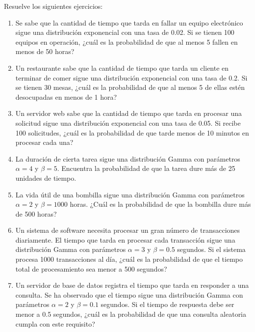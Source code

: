 \begin{Ejer}
Resuelve los siguientes ejercicios:
\begin{enumerate}

    \item Se sabe que la cantidad de tiempo que tarda en fallar un equipo electrónico sigue una distribución exponencial con una tasa de 0.02. Si se tienen 100 equipos en operación, ¿cuál es la probabilidad de que al menos 5 fallen en menos de 50 horas?

    \item Un restaurante sabe que la cantidad de tiempo que tarda un cliente en terminar de comer sigue una distribución exponencial con una tasa de 0.2. Si se tienen 30 mesas, ¿cuál es la probabilidad de que al menos 5 de ellas estén desocupadas en menos de 1 hora?

    \item Un servidor web sabe que la cantidad de tiempo que tarda en procesar una solicitud sigue una distribución exponencial con una tasa de 0.05. Si recibe 100 solicitudes, ¿cuál es la probabilidad de que tarde menos de 10 minutos en procesar cada una?

\item La duración de cierta tarea sigue una distribución Gamma con parámetros $\alpha = 4$ y $\beta = 5$. Encuentra la probabilidad de que la tarea dure más de 25 unidades de tiempo.

\item La vida útil de una bombilla sigue una distribución Gamma con parámetros $\alpha = 2$ y $\beta = 1000$ horas. ¿Cuál es la probabilidad de que la bombilla dure más de 500 horas?

\item Un sistema de software necesita procesar un gran número de transacciones diariamente. El tiempo que tarda en procesar cada transacción sigue una distribución Gamma con parámetros $\alpha = 3$ y $\beta = 0.5$ segundos. Si el sistema procesa 1000 transacciones al día, ¿cuál es la probabilidad de que el tiempo total de procesamiento sea menor a 500 segundos?

\item Un servidor de base de datos registra el tiempo que tarda en responder a una consulta. Se ha observado que el tiempo sigue una distribución Gamma con parámetros $\alpha = 2$ y $\beta = 0.1$ segundos. Si el tiempo de respuesta debe ser menor a 0.5 segundos, ¿cuál es la probabilidad de que una consulta aleatoria cumpla con este requisito?


\end{enumerate}
\end{Ejer}

